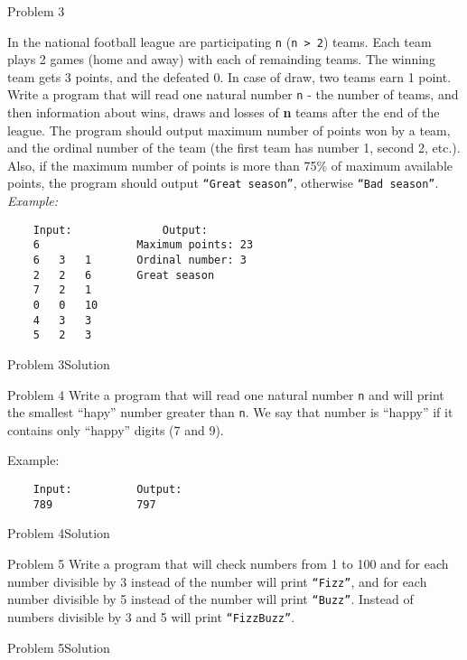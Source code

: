 \begin{frame}[fragile]{Problem 3}
\begin{tiny}
In the national football league are participating \texttt{n} (\texttt{n > 2})
teams. Each team plays 2 games (home and away) with each of remainding teams.
The winning team gets 3 points, and the defeated 0. In case of draw, two teams
earn 1 point. Write a program that will read one natural number \texttt{n} - the
number of teams, and then information about wins, draws and losses of \textbf{n}
teams after the end of the league. The program should output maximum number of
points won by a team, and the ordinal number of the team (the first team has
number 1, second 2, etc.). Also, if the maximum number of points is more than
75\% of maximum available points, the program should output \texttt{``Great
season''}, otherwise \texttt{``Bad season''}.
\emph{Example:}
\begin{verbatim}
	Input:				Output:
	6               Maximum points: 23
	6   3   1	    Ordinal number: 3
	2   2   6	    Great season
	7   2   1
	0   0   10
	4   3   3
	5   2   3
\end{verbatim}
\end{tiny}
\end{frame}

\begin{frame}[fragile]{Problem 3}{Solution}

\end{frame}

\begin{frame}[fragile]{Problem 4}
Write a program that will read one natural number \texttt{n} and will print the
smallest ``hapy'' number greater than \texttt{n}. We say that number is
``happy'' if it contains only ``happy'' digits (7 and 9).

Example:
\begin{verbatim}
	Input:			Output:
	789				797
\end{verbatim}

\end{frame}

\begin{frame}[fragile]{Problem 4}{Solution}

\end{frame}

\begin{frame}[fragile]{Problem 5}
Write a program that will check numbers from 1 to 100 and for each number
divisible by 3 instead of the number will print \texttt{``Fizz''}, and for each
number divisible by 5 instead of the number will print \texttt{``Buzz''}.
Instead of numbers divisible by 3 and 5 will print \texttt{``FizzBuzz''}.
\end{frame}

\begin{frame}[fragile]{Problem 5}{Solution}

\end{frame}
